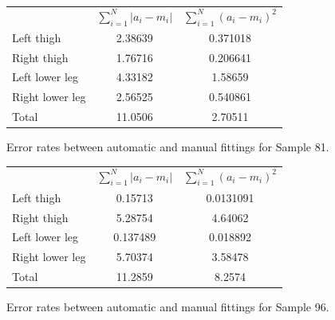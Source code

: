 \begin{figure}[thb]
	\begin{center}
		\begin{tabular}{l|c|c}
			& $\sum_{i=1}^N \left| a_i - m_i \right|$ & $\sum_{i=1}^N \left( a_i - m_i \right)^2 $ \\
			Left thigh & 2.38639 & 0.371018 \\
			Right thigh & 1.76716 & 0.206641 \\
			Left lower leg & 4.33182 & 1.58659 \\
			Right lower leg & 2.56525 & 0.540861 \\
			\hline
			Total & 11.0506 & 2.70511
		\end{tabular}
	\end{center}
	\caption{Error rates between automatic and manual fittings for Sample 81.}
	\label{ManualFitTable81}
\end{figure}

\begin{figure}[thb]
	\begin{center}
		\begin{tabular}{l|c|c}
			& $\sum_{i=1}^N \left| a_i - m_i \right|$ & $\sum_{i=1}^N \left( a_i - m_i \right)^2 $ \\
			Left thigh & 0.15713 & 0.0131091 \\
			Right thigh & 5.28754 & 4.64062 \\
			Left lower leg & 0.137489 & 0.018892 \\
			Right lower leg & 5.70374 & 3.58478 \\
			\hline
			Total & 11.2859 & 8.2574 \\
		\end{tabular}
	\end{center}
	\caption{Error rates between automatic and manual fittings for Sample 96.}
	\label{ManualFitTable96}
\end{figure}

